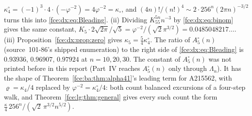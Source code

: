 \documentclass[11pt,a4paper]{article}
\numberwithin{equation}{section}
\theoremstyle{definition}\newtheorem{definition}[theorem]{Definition}
\theoremstyle{remark}\newtheorem{remark}[theorem]{Remark}
\begin{document}
$\kappa^\circ_4=(-1)^{3}\cdot4\cdot(-\varphi^{-2})=4\varphi^{-2}=\kappa_\circ$,
and $(4n)!/(n!)^4\sim2\cdot256^n(2\pi n)^{-3/2}$ turns this into
\eqref{fce:dx:eq:Bleading}. (ii) Dividing $K_55^{5n}n^{-3}$ by
\eqref{fce:dx:eq:binom} gives the same constant,
$K_5\cdot2\sqrt{2\pi}/\sqrt5=\varphi^{-2}/(\sqrt2\pi^{3/2})=0.0485048217\ldots$.
(iii) Proposition~\ref{fce:dx:prop:zero} gives $\kappa_5=\frac54\kappa^\circ_4$.
The ratio of $A^\circ_5(n)$ (source~101-86's shipped enumeration) to the right
side of \eqref{fce:dx:eq:Bleading} is $0.93936$, $0.96907$, $0.97924$ at
$n=10,20,30$. The constant of $A^\circ_5(n)$ was not printed before in this
report (Part~IV reaches $A^\circ_5(n)$ only through $\Lambda_n$). It has the
shape of Theorem~\ref{fce:ba:thm:alpha41}'s leading term for A215562, with
$\varrho=\kappa_4/4$ replaced by $\varphi^{-2}=\kappa^\circ_4/4$: both count
balanced excursions of a four-step walk, and Theorem~\ref{fce:lg:thm:general}
gives every such count the form
$\frac\kappa4\,256^n/(\sqrt2\,\pi^{3/2}n^{5/2})$.
\end{document}
